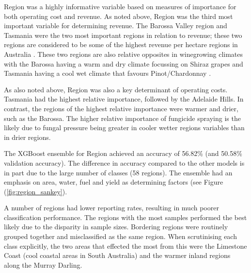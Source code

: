 \documentclass[review,12pt,authoryear]{elsarticle}
\begin{document}
\begin{linenumbers}
Region was a highly informative variable based on measures of importance for both operating cost and revenue. As noted above, Region was the third most important variable for determining revenue. The Barossa Valley region and Tasmania were the two most important regions in relation to revenue; these two regions are considered to be some of the highest revenue per hectare regions in Australia \citep{wineaustraliaNationalVintageReport2022}. These two regions are also relative opposites in winegrowing climates with the Barossa having a warm and dry climate focussing on Shiraz grapes and Tasmania having a cool wet climate that favours Pinot/Chardonnay \citep{wineaustraliaNationalVintageReport2022}.
\par
As also noted above, Region was also a key determinant of operating costs. Tasmania had the highest relative importance, followed by the Adelaide Hills. In contrast, the regions of the highest relative importance were warmer and drier, such as the Barossa. The higher relative importance of fungicide spraying is the likely due to fungal pressure being greater in cooler wetter regions variables than in drier regions.
\par
The XGBoost ensemble for Region achieved an accuracy of 56.82\% (and 50.58\% validation accuracy). The difference in accuracy compared to the other models is in part due to the large number of classes (58 regions). The ensemble had an emphasis on area, water, fuel and yield as determining factors (see Figure (\ref{fig:region_sankey}).
\par
A number of regions had lower reporting rates, resulting in much poorer classification performance. The regions with the most samples performed the best likely due to the disparity in sample sizes. Bordering regions were routinely grouped together and misclassified as the same region. When scrutinising each class explicitly, the two areas that effected the most from this were the Limestone Coast (cool coastal areas in South Australia) and the warmer inland regions along the Murray Darling.


\end{linenumbers}
\end{document}
